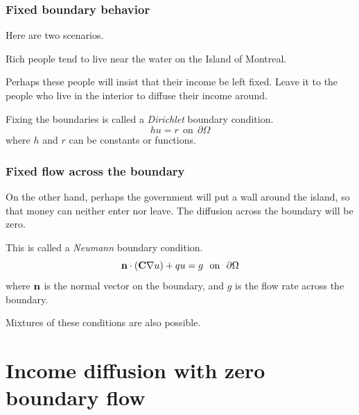 \documentclass[11pt]{beamer}
\begin{document}
\begin{frame}

\frametitle{Fixed boundary behavior}

\bi
  \item Here are two scenarios.
  \item Rich people tend to live near the water on the Island of
  Montreal.
  \item Perhaps these people will insist that their income be left
  fixed.  Leave it to the people who live in the interior to
  diffuse their income around.
  \item Fixing the boundaries is called a \emph{Dirichlet} boundary
  condition.
  \[
    hu = r \ \ \mbox{on} \ \ \partial \Omega
  \]
  where $h$ and $r$ can be constants or functions.
\ei

\end{frame}


\begin{frame}


\frametitle{Fixed flow across the boundary}

\bi
  \item On the other hand, perhaps the government will put a wall
  around the island, so that money can neither enter nor leave.
  The diffusion across the boundary will be zero.
  \item This is called a \emph{Neumann} boundary condition.
  \[
    \mbox{\bf n} \cdot(\mbox{\bf C} \nabla u) + q u = g
     \ \ \mbox{on} \ \ \partial \Omega
  \]
  where $\mbox{\bf n}$ is the normal vector on the boundary,
  and $g$ is the flow rate across the boundary.
  \item Mixtures of these conditions are also possible.
\ei

\end{frame}



\section{Income diffusion with zero boundary flow}
\end{document}
